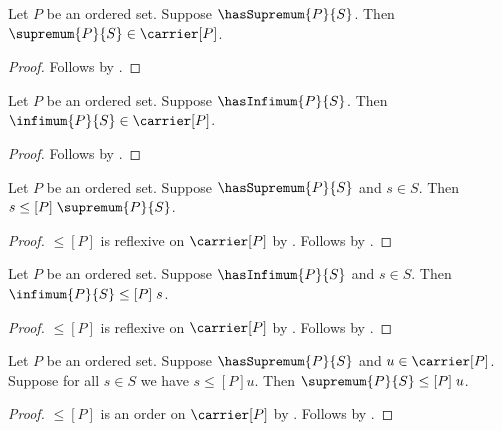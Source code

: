 \begin{proposition}\label{supremum_type}
    Let $P$ be an ordered set.
    Suppose $\hasSupremum{P}{S}$.
    Then $\supremum{P}{S}\in\carrier[P]$.
\end{proposition}
\begin{proof}
    Follows by
        .
\end{proof}

\begin{proposition}\label{infimum_type}
    Let $P$ be an ordered set.
    Suppose $\hasInfimum{P}{S}$.
    Then $\infimum{P}{S}\in\carrier[P]$.
\end{proposition}
\begin{proof}
    Follows by
        .
\end{proof}

\begin{proposition}\label{supremum_upper}
    Let $P$ be an ordered set.
    Suppose $\hasSupremum{P}{S}$ and $s\in S$.
    Then $s\mathrel{\leq[P]}\supremum{P}{S}$.
\end{proposition}
\begin{proof}
    $\leq[P]$ is reflexive on $\carrier[P]$ by
        .
    Follows by
        .
\end{proof}

\begin{proposition}\label{infimum_lower}
    Let $P$ be an ordered set.
    Suppose $\hasInfimum{P}{S}$ and $s\in S$.
    Then $\infimum{P}{S}\mathrel{\leq[P]}s$.
\end{proposition}
\begin{proof}
    $\leq[P]$ is reflexive on $\carrier[P]$ by
        .
    Follows by
        .
\end{proof}

\begin{proposition}\label{supremum_least}
    Let $P$ be an ordered set.
    Suppose $\hasSupremum{P}{S}$ and $u\in\carrier[P]$.
    Suppose for all $s\in S$ we have $s\mathrel{\leq[P]}u$.
    Then $\supremum{P}{S}\mathrel{\leq[P]}u$.
\end{proposition}
\begin{proof}
    $\leq[P]$ is an order on $\carrier[P]$ by
        .
    Follows by
        .
\end{proof}

